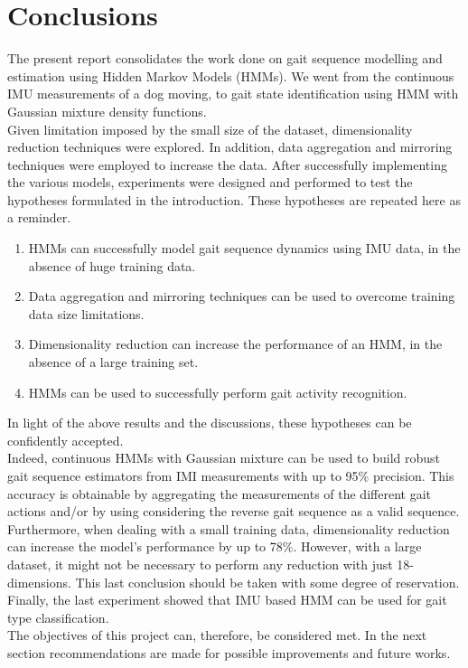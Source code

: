 \chapter{Conclusions}
The present report consolidates the work done on gait sequence modelling and estimation using Hidden Markov Models (HMMs). 
We went from the continuous IMU measurements of a dog moving, to gait state identification using HMM with Gaussian mixture density functions.\\
Given limitation imposed by the small size of the dataset, dimensionality reduction techniques were explored. In addition, data aggregation and mirroring techniques were employed to increase the data. After successfully implementing the various models, experiments were designed and performed to test the hypotheses formulated in the introduction. These hypotheses are repeated here as a reminder.
\begin{enumerate}
	\item HMMs can successfully model gait sequence dynamics using IMU data, in the absence of huge training data.
	\item Data aggregation and mirroring techniques can be used to overcome training data size limitations.
	\item Dimensionality reduction can increase the performance of an HMM, in the absence of a large training set.
	\item HMMs can be used to successfully perform gait activity recognition.
\end{enumerate}
In light of the above results and the discussions, these hypotheses can be confidently accepted. \\
Indeed, continuous HMMs with Gaussian mixture can be used to build robust gait sequence estimators from IMI measurements with up to 95\% precision.
This accuracy is obtainable by aggregating the measurements of the different gait actions and/or by using considering the reverse gait sequence as a valid sequence.\\
Furthermore, when dealing with a small training data, dimensionality reduction can increase the model's performance by up to 78\%. However, with a large dataset, it might not be necessary to perform any reduction with just 18-dimensions. This last conclusion should be taken with some degree of reservation.
Finally, the last experiment showed that IMU based HMM can be used for gait type classification.\\
The objectives of this project can, therefore, be considered met. In the next section recommendations are made for possible improvements and future works.